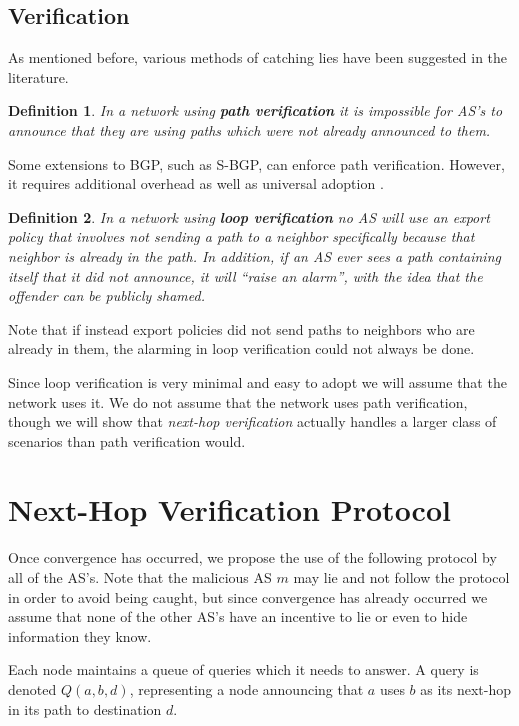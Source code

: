 \documentclass[10pt]{article}
\newtheorem{definition}{Definition}
\begin{document}
\subsection{Verification}
As mentioned before, various methods of catching lies have been suggested in the literature.

\begin{definition}
In a network using \textbf{path verification} it is impossible for AS's to announce that they are using paths which were not already announced to them.
\end{definition}

Some extensions to BGP, such as S-BGP, can enforce path verification. However, it requires additional overhead as well as universal adoption \cite{PartialDeploy}.

\begin{definition}
In a network using \textbf{loop verification} no AS will use an export policy that involves not sending a path to a neighbor specifically because that neighbor is already in the path. In addition, if an AS ever sees a path containing itself that it did not announce, it will ``raise an alarm'', with the idea that the offender can be publicly shamed.
\end{definition}

Note that if instead export policies did not send paths to neighbors who are already in them, the alarming in loop verification could not always be done.

Since loop verification is very minimal and easy to adopt we will assume that the network uses it.
We do not assume that the network uses path verification, though we will show that \emph{next-hop verification} actually handles a larger class of scenarios than path verification would.


\section{Next-Hop Verification Protocol}
Once convergence has occurred, we propose the use of the following protocol by all of the AS's. Note that the malicious AS $m$ may lie and not follow the protocol in order to avoid being caught, but since convergence has already occurred we assume that none of the other AS's have an incentive to lie or even to hide information they know.

  Each node maintains a queue of queries which it needs to answer.
  A query is denoted $Q(a,b,d)$, representing a node announcing that
  $a$ uses $b$ as its next-hop in its path to destination $d$.
\end{document}
